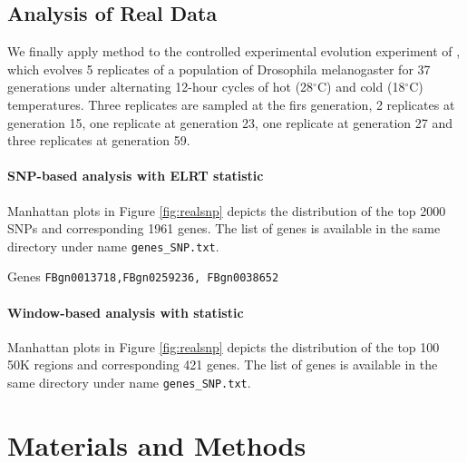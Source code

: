 \documentclass[11pt]{article}
\def\comale{\text{COMALE }}
\begin{document}
\subsection{Analysis of Real Data}
We finally apply \comale method to the controlled experimental evolution 
experiment 
of \cite{orozco2012adaptation}, which evolves 5 replicates of a population of 
Drosophila melanogaster for 37 generations under alternating 12-hour cycles of 
hot (28$^{\circ}$C) and cold (18$^{\circ}$C) temperatures. Three replicates are 
sampled at the firs generation, 2 replicates at generation 15, one replicate at 
generation 23, one replicate at generation 27 and three replicates at 
generation 59.


\paragraph{SNP-based analysis with ELRT statistic}
Manhattan plots in Figure \ref{fig:realsnp} depicts the distribution of the top 2000 SNPs and corresponding 1961 genes. The list of genes is available in the same directory under name \texttt{genes\_SNP.txt}.


Genes \texttt{FBgn0013718,FBgn0259236, FBgn0038652}

\paragraph{Window-based analysis with \comale statistic}
Manhattan plots in Figure \ref{fig:realsnp} depicts the distribution of the top 100 50K regions and corresponding 421 genes. The list of genes is available in the same directory under name \texttt{genes\_SNP.txt}.

\section{Materials and Methods}
\end{document}
